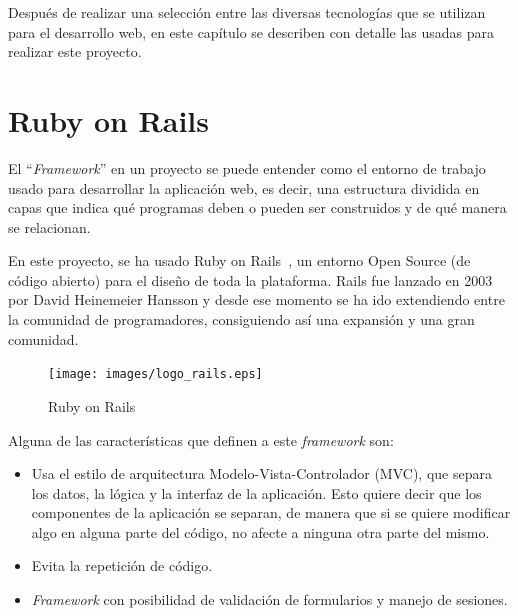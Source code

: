 
Después de realizar una selección entre las diversas tecnologías que se utilizan para el desarrollo web, en este capítulo se describen con detalle las usadas para realizar este proyecto.


\section{Ruby on Rails}
\label{3:sec:1}

El ``\textit{Framework}'' en un proyecto se puede entender como el entorno de trabajo usado para desarrollar la aplicación web, es decir, una estructura dividida en capas que indica qué programas deben o pueden ser construidos y de qué manera se relacionan.

En este proyecto, se ha usado Ruby on Rails~\cite{Rails}, un entorno Open Source (de código abierto) para el diseño de toda la plataforma. Rails fue lanzado en 2003 por David Heinemeier Hansson y desde ese momento se ha ido extendiendo entre la comunidad de programadores, consiguiendo así una expansión y una gran comunidad.

\begin{figure}[!th]
\begin{center}
\texttt{[image: images/logo\_rails.eps]}
\caption{Ruby on Rails}
\label{fig:4}
\end{center}
\end{figure}

Alguna de las características que definen a este \textit{framework} son:

\begin{itemize}
    \item Usa el estilo de arquitectura Modelo-Vista-Controlador (MVC), que separa los datos, la lógica y la interfaz de la aplicación. Esto quiere decir que los componentes de la aplicación se separan, de manera que si se quiere
    modificar algo en alguna parte del código, no afecte a ninguna otra parte del mismo.
    \item Evita la repetición de código.
    \item \textit{Framework} con posibilidad de validación de formularios y manejo de sesiones.
\end{itemize}

